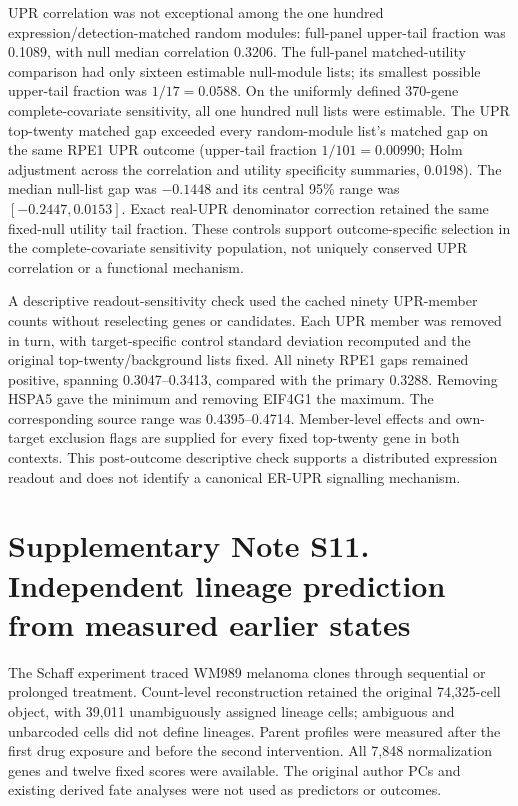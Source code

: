 \documentclass[a4paper,fleqn]{cas-sc}
\makeatletter
\DeclareRobustCommand{\rev}[1]{{\color{red}\def\@citecolor{black}\def\@linkcolor{red}\def\@urlcolor{red}#1}}
\makeatother
\begin{document}
\rev{UPR correlation was not exceptional among the one hundred expression/detection-matched random modules: full-panel upper-tail fraction was 0.1089, with null median correlation 0.3206.} \rev{The full-panel matched-utility comparison had only sixteen estimable null-module lists; its smallest possible upper-tail fraction was $1/17=0.0588$.} \rev{On the uniformly defined 370-gene complete-covariate sensitivity, all one hundred null lists were estimable.} \rev{The UPR top-twenty matched gap exceeded every random-module list's matched gap on the same RPE1 UPR outcome (upper-tail fraction $1/101=0.00990$; Holm adjustment across the correlation and utility specificity summaries, 0.0198).} \rev{The median null-list gap was $-0.1448$ and its central 95\% range was $[-0.2447,0.0153]$.} \rev{Exact real-UPR denominator correction retained the same fixed-null utility tail fraction.} \rev{These controls support outcome-specific selection in the complete-covariate sensitivity population, not uniquely conserved UPR correlation or a functional mechanism.}

\rev{A descriptive readout-sensitivity check used the cached ninety UPR-member counts without reselecting genes or candidates.} \rev{Each UPR member was removed in turn, with target-specific control standard deviation recomputed and the original top-twenty/background lists fixed.} \rev{All ninety RPE1 gaps remained positive, spanning 0.3047--0.3413, compared with the primary 0.3288.} \rev{Removing HSPA5 gave the minimum and removing EIF4G1 the maximum.} \rev{The corresponding source range was 0.4395--0.4714.} \rev{Member-level effects and own-target exclusion flags are supplied for every fixed top-twenty gene in both contexts.} \rev{This post-outcome descriptive check supports a distributed expression readout and does not identify a canonical ER-UPR signalling mechanism.}


\section*{\rev{Supplementary Note S11. Independent lineage prediction from measured earlier states}}

\rev{The Schaff experiment traced WM989 melanoma clones through sequential or prolonged treatment.} \rev{Count-level reconstruction retained the original 74,325-cell object, with 39,011 unambiguously assigned lineage cells; ambiguous and unbarcoded cells did not define lineages.} \rev{Parent profiles were measured after the first drug exposure and before the second intervention.} \rev{All 7,848 normalization genes and twelve fixed scores were available.} \rev{The original author PCs and existing derived fate analyses were not used as predictors or outcomes.}
\end{document}
